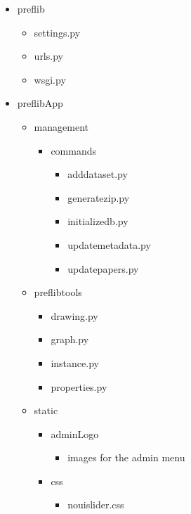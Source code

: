 \documentclass{report}
\begin{document}
	\begin{figure}
		\begin{multicols}{2}
			\begin{itemize}
				\item[\faFolderO] preflib
				\begin{itemize}
					\item[\faFileO] settings.py
					\item[\faFileO] urls.py
					\item[\faFileO] wsgi.py
				\end{itemize}
				\item[\faFolderO] preflibApp
				\begin{itemize}
					\item [\faFolderO] management
					\begin{itemize}
						\item[\faFolderO] commands
						\begin{itemize}
							\item[\faFileO] adddataset.py
							\item[\faFileO] generatezip.py
							\item[\faFileO] initializedb.py
							\item[\faFileO] updatemetadata.py
							\item[\faFileO] updatepapers.py
						\end{itemize}
					\end{itemize}
					\item[\faFolderO] preflibtools
					\begin{itemize}
						\item[\faFileO] drawing.py
						\item[\faFileO] graph.py
						\item[\faFileO] instance.py
						\item[\faFileO] properties.py
					\end{itemize}
					\item[\faFolderO] static
					\begin{itemize}
						\item[\faFolderO] adminLogo
						\begin{itemize}
							\item[\faFilesO] images for the admin menu
						\end{itemize}
						\item[\faFolderO] css
						\begin{itemize}
							\item[\faFileO] nouislider.css

\end{itemize}
\end{itemize}
\end{itemize}
\end{itemize}
\end{multicols}
\end{figure}
\end{document}
